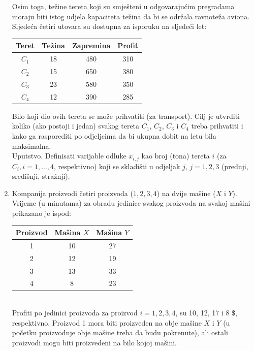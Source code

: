 \documentclass[a4paper, utf8, 11pt, colorlinks]{book}
\begin{document}
\begin{enumerate}
Osim toga, težine tereta koji su smješteni u odgovarajućim pregradama moraju biti istog udjela  kapaciteta težina da bi se održala ravnoteža aviona. Sljedeća četiri utovara su dostupna za isporuku na sljedeći let: 
	
\begin{table}[!ht]
	 \centering	
	\begin{tabular}{cccc}
	    Teret & Težina & Zapremina & Profit \\ \hline
	    $C_1$  & 18     & 480       & 310    \\
	    $C_2$  & 15     & 650       & 380    \\
	    $C_3$  & 23     & 580       & 350    \\
	    $C_4$  & 12     & 390       & 285    \\ \hline
	\end{tabular}
\end{table}
Bilo koji dio ovih tereta se može   prihvatiti (za transport). Cilj je utvrditi koliko (ako postoji i jedan) svakog tereta $C_1$, $C_2$, $C_3$ i $C_4$ treba prihvatiti i kako ga rasporediti po odjeljcima da bi ukupna dobit na letu bila maksimalna. \\
Uputstvo. Definisati varijable odluke $x_{i,j}$ kao broj (tona) tereta $i$   (za $C_i, i=1, \ldots,4$,  respektivno) koji se skladišti  u odjeljak $j$, $j=1,2,3$ (prednji, središnji, stražnji).  %
\item Kompanija proizvodi četiri proizvoda ($1,2,3,4$) na dvije mašine ($X$ i $Y$). Vrijeme (u minutama) za obradu jedinice svakog proizvoda na svakoj mašini prikazano je ispod: 
\begin{table}[!ht]
	\centering	
	\begin{tabular}{ccc}
		Proizvod   & Mašina $X$ & Mašina $Y$ \\ \hline
		1          & 10         & 27         \\
		2          & 12         & 19         \\
		3          & 13         & 33         \\
		4          & 8          & 23         \\ \hline
	\end{tabular}
\end{table}	\\
Profiti po jedinici proizvoda za proizvod $i=1,2,3,4$, su 10, 12, 17 i 8 \$, respektivno. Proizvod 1 mora biti proizveden na obje mašine $X$ i $Y$ (u početku proizvodnje obje mašine treba da budu pokrenute), ali ostali proizvodi  mogu biti proizvedeni na bilo kojoj mašini. 


\end{enumerate}
\end{document}
